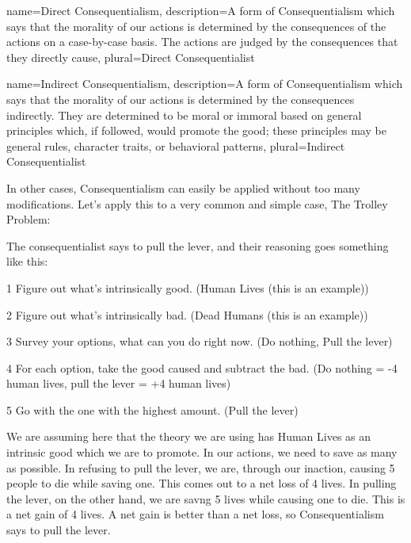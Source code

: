{
  name=Direct Consequentialism,
  description={A form of Consequentialism which says that the morality of our actions is determined by the consequences of the actions on a case-by-case basis. The actions are judged by the consequences that they directly cause},
  plural=Direct Consequentialist
}

{
  name=Indirect Consequentialism,
  description={A form of Consequentialism which says that the morality of our actions is determined by the consequences indirectly. They are determined to be moral or immoral based on general principles which, if followed, would promote the good; these principles may be general rules, character traits, or behavioral patterns},
  plural=Indirect Consequentialist
}

In other cases, Consequentialism can easily be applied without too many modifications. Let's apply this to a very common and simple case, The Trolley Problem:


The consequentialist says to pull the lever, and their reasoning goes something like this:
\begin{earg}
    \item[1] Figure out what’s intrinsically good. (Human Lives (this is an example))
    \item[2] Figure out what’s intrinsically bad. (Dead Humans (this is an example))
    \item[3] Survey your options, what can you do right now. (Do nothing, Pull the lever)
    \item[4] For each option, take the good caused and subtract the bad. (Do nothing = -4 human lives, pull the lever = +4 human lives)
    \item[5] Go with the one with the highest amount. (Pull the lever)
\end{earg}

We are assuming here that the theory we are using has Human Lives as an intrinsic good which we are to promote. In our actions, we need to save as many as possible. In refusing to pull the lever, we are, through our inaction, causing 5 people to die while saving one. This comes out to a net loss of 4 lives. In pulling the lever, on the other hand, we are savng 5 lives while causing one to die. This is a net gain of 4 lives. A net gain is better than a net loss, so Consequentialism says to pull the lever. 


